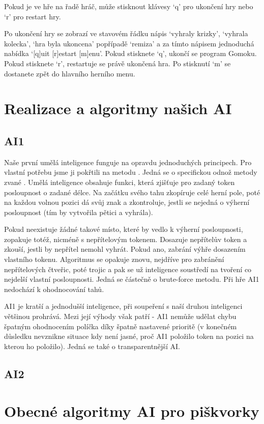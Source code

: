 \documentclass[a4paper,11pt,titlepage]{article}
\begin{document}
Pokud je ve hře na řadě hráč, může stisknout klávesy `q' pro ukončení hry nebo `r' pro restart hry.

Po ukončení hry se zobrazí ve stavovém řádku nápis `vyhraly krizky', `vyhrala kolecka', `hra byla ukoncena' popřípadě `remiza' a za tímto nápisem jednoduchá nabídka `[q]uit [r]estart [m]enu'. Pokud stisknete `q', ukončí se program Gomoku. Pokud stisknete `r', restartuje se právě ukončená hra. Po stisknutí `m' se dostanete zpět do hlavního herního menu.
\newpage
\section{Realizace a algoritmy našich AI}
\subsection{AI1}
Naše první umělá inteligence funguje na opravdu jednoduchých principech. Pro vlastní potřebu jsme ji pokřtili na metodu . Jedná se o spe\-ci\-fic\-kou od\-nož me\-to\-dy zva\-né . Umělá inteligence obsahuje funkci, která zjišťuje pro zadaný token posloupnost o zadané délce. Na začátku svého tahu zkopíruje celé herní pole, poté na každou volnou pozici dá svůj znak a zkontroluje, jestli se nejedná o výherní posloupnost (tím by vytvořila pětici a vyhrála). 

Pokud neexistuje žádné takové místo, které by vedlo k výherní posloupnosti, zopakuje totéž, nicméně s nepřítelovým tokenem. Dosazuje nepřítelův token a zkouší, jestli by nepřítel nemohl vyhrát. Pokud ano, zabrání výhře dosazením vlastního tokenu. Algoritmus se opakuje znovu, nejdříve pro za\-brá\-ně\-ní nepřítelových čtveřic, poté trojic a pak se už inteligence soustředí na tvoření co nejdelší vlastní posloupnosti. Jedná se částečně o brute-force metodu. Při hře AI1 nedochází k ohodnocování tahů.

AI1 je kratší a jednodušší inteligence, při soupeření s naší druhou inteligenci většinou prohrává. Mezi její výhody však patří  - AI1 nemůže udělat chybu špatným ohodnocením políčka díky špatně nastavené prioritě (v konečném důsledku nevznikne situace kdy není jasné, proč AI1 položilo token na pozici na kterou ho položilo). Jedná se také o transparentnější AI.
\subsection{AI2}
\section{Obecné algoritmy AI pro piškvorky}
\newpage
\end{document}
